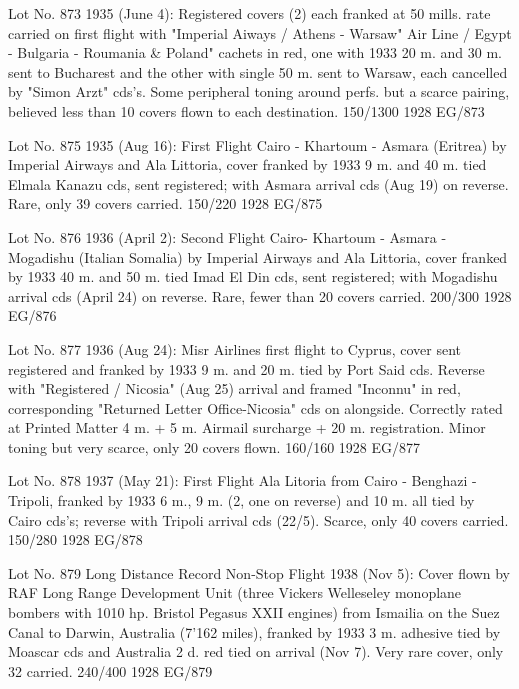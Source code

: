\documentclass[justified]{tufte-book}
\begin{document}
%
{Lot No. 873
1935 (June 4): Registered covers (2) each franked at 50 mills. rate carried on first flight with "Imperial Aiways / Athens - Warsaw" Air Line / Egypt - Bulgaria - Roumania \& Poland" cachets in red, one with 1933 20 m. and 30 m. sent to Bucharest and the other with single 50 m. sent to Warsaw, each cancelled by "Simon Arzt" cds's. Some peripheral toning around perfs. but a scarce pairing, believed less than 10 covers flown to each destination.  150/1300}%
{1928}%
{EG/873}%
{}%
{}
{}%
{}


%
{Lot No. 875
1935 (Aug 16): First Flight Cairo - Khartoum - Asmara (Eritrea) by Imperial Airways and Ala Littoria, cover franked by 1933 9 m. and 40 m. tied Elmala Kanazu cds, sent registered; with Asmara arrival cds (Aug 19) on reverse. Rare, only 39 covers carried.  150/220}%
{1928}%
{EG/875}%
{}%
{}
{}%
{}

%
{Lot No. 876
1936 (April 2): Second Flight Cairo- Khartoum - Asmara - Mogadishu (Italian Somalia) by Imperial Airways and Ala Littoria, cover franked by 1933 40 m. and 50 m. tied Imad El Din cds, sent registered; with Mogadishu arrival cds (April 24) on reverse. Rare, fewer than 20 covers carried.  200/300}%
{1928}%
{EG/876}%
{}%
{}
{}%
{}


%
{Lot No. 877
1936 (Aug 24): Misr Airlines first flight to Cyprus, cover sent registered and franked by 1933 9 m. and 20 m. tied by Port Said cds. Reverse with "Registered / Nicosia" (Aug 25) arrival and framed "Inconnu" in red, corresponding "Returned Letter Office-Nicosia" cds on alongside. Correctly rated at Printed Matter 4 m. + 5 m. Airmail surcharge + 20 m. registration. Minor toning but very scarce, only 20 covers flown.  160/160}%
{1928}%
{EG/877}%
{}%
{}
{}%
{}

%
{Lot No. 878
1937 (May 21): First Flight Ala Litoria from Cairo - Benghazi - Tripoli, franked by 1933 6 m., 9 m. (2, one on reverse) and 10 m. all tied by Cairo cds's; reverse with Tripoli arrival cds (22/5). Scarce, only 40 covers carried.  150/280}%
{1928}%
{EG/878}%
{}%
{}
{}%
{}

%
{Lot No. 879
Long Distance Record Non-Stop Flight 1938 (Nov 5): Cover flown by RAF Long Range Development Unit (three Vickers Welleseley monoplane bombers with 1010 hp. Bristol Pegasus XXII engines) from Ismailia on the Suez Canal to Darwin, Australia (7'162 miles), franked by 1933 3 m. adhesive tied by Moascar cds and Australia 2 d. red tied on arrival (Nov 7). Very rare cover, only 32 carried.  240/400}%
{1928}%
{EG/879}%
{}%
{}
{}%
{}
\end{document}
